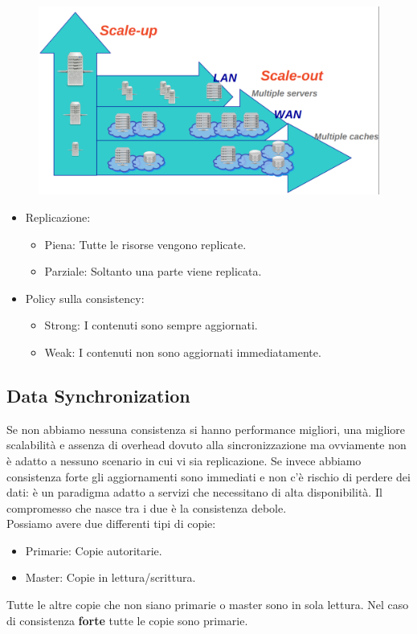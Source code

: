 \documentclass{article}
\begin{document}
		\begin{figure}[ht]
			\centering
			\includegraphics[width=0.65\linewidth]{SAC_A5_scaling}
			\label{fig:saca5scaling}
		\end{figure}
		
		\begin{itemize}
		    \item Replicazione:
		    \begin{itemize}
		        \item Piena: Tutte le risorse vengono replicate.
		        \item Parziale: Soltanto una parte viene replicata.
		    \end{itemize}
		    \item Policy sulla consistency: \begin{itemize}
		        \item Strong: I contenuti sono sempre aggiornati.
		        \item Weak: I contenuti non sono aggiornati immediatamente.
		    \end{itemize}
		\end{itemize}
		
		\subsection{Data Synchronization}
		Se non abbiamo nessuna consistenza si hanno performance migliori, una migliore scalabilità e assenza di overhead dovuto alla sincronizzazione ma ovviamente non è adatto a nessuno scenario in cui vi sia replicazione.
		Se invece abbiamo consistenza forte gli aggiornamenti sono immediati e non c'è rischio di perdere dei dati: è un paradigma adatto a servizi che necessitano di alta disponibilità. Il compromesso che nasce tra i due è la consistenza debole.\\
		
		Possiamo avere due differenti tipi di copie:
		\begin{itemize}
		    \item Primarie: Copie autoritarie.
		    \item Master: Copie in lettura/scrittura.
		\end{itemize}
		Tutte le altre copie che non siano primarie o master sono in sola lettura. Nel caso di consistenza \textbf{forte} tutte le copie sono primarie.
		
\end{document}
